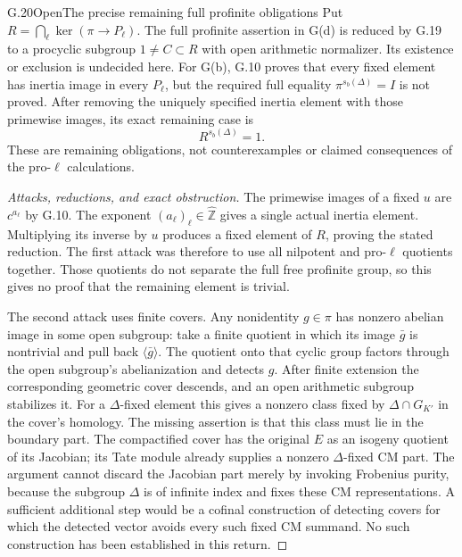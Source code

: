 \begin{statement}{G.20}{Open}{The precise remaining full profinite obligations}
Put $R=\bigcap_\ell\ker(\pi\to P_\ell)$. The full profinite
assertion in G(d) is reduced by G.19 to a procyclic subgroup
$1\ne C\subset R$ with open arithmetic normalizer. Its existence
or exclusion is undecided here. For G(b), G.10 proves that every
fixed element has inertia image in every $P_\ell$, but the
required full equality $\pi^{s_b(\Delta)}=I$ is not proved.
After removing the uniquely specified inertia element with those
primewise images, its exact remaining case is
\[
                         R^{s_b(\Delta)}=1.
\]
These are remaining obligations, not counterexamples or claimed
consequences of the pro-$\ell$ calculations.
\end{statement}
\begin{proof}[Attacks, reductions, and exact obstruction]
The primewise images of a fixed $u$ are $c^{a_\ell}$ by G.10.
The exponent $(a_\ell)_\ell\in\widehat{\mathbb Z}$ gives a
single actual inertia element. Multiplying its inverse by $u$
produces a fixed element of $R$, proving the stated reduction.
The first attack was therefore to use all nilpotent and pro-$\ell$
quotients together. Those quotients do not separate the full free
profinite group, so this gives no proof that the remaining element
is trivial.

The second attack uses finite covers. Any nonidentity $g\in\pi$
has nonzero abelian image in some open subgroup: take a finite
quotient in which its image $\bar g$ is nontrivial and pull back
$\langle\bar g\rangle$. The quotient onto that cyclic group
factors through the open subgroup's abelianization and detects $g$.
After finite extension the corresponding geometric cover descends,
and an open arithmetic subgroup stabilizes it. For a
$\Delta$-fixed element this gives a nonzero class fixed by
$\Delta\cap G_{K'}$ in the cover's homology. The missing assertion
is that this class must lie in the boundary part. The compactified
cover has the original $E$ as an isogeny quotient of its Jacobian;
its Tate module already supplies a nonzero $\Delta$-fixed CM part.
The argument cannot discard the Jacobian part merely by invoking
Frobenius purity, because the subgroup $\Delta$ is of infinite
index and fixes these CM representations. A sufficient additional
step would be a cofinal construction of detecting covers for which
the detected vector avoids every such fixed CM summand. No such
construction has been established in this return.


\end{proof}
